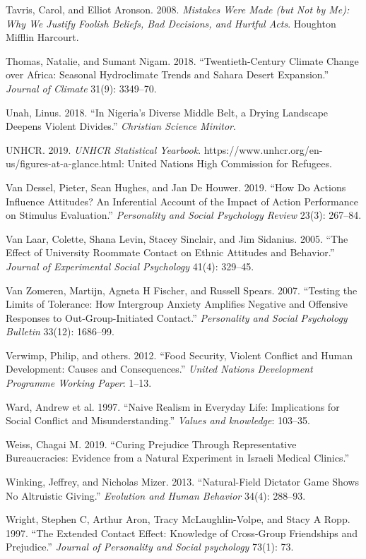 \documentclass[11pt]{article}
\begin{document}
\leavevmode\hypertarget{ref-tavris2008mistakes}{}%
Tavris, Carol, and Elliot Aronson. 2008. \emph{Mistakes Were Made (but
Not by Me): Why We Justify Foolish Beliefs, Bad Decisions, and Hurtful
Acts}. Houghton Mifflin Harcourt.

\leavevmode\hypertarget{ref-thomas2018sahara}{}%
Thomas, Natalie, and Sumant Nigam. 2018. ``Twentieth-Century Climate
Change over Africa: Seasonal Hydroclimate Trends and Sahara Desert
Expansion.'' \emph{Journal of Climate} 31(9): 3349--70.

\leavevmode\hypertarget{ref-unah2018nigeria}{}%
Unah, Linus. 2018. ``In Nigeria's Diverse Middle Belt, a Drying
Landscape Deepens Violent Divides.'' \emph{Christian Science Minitor}.

\leavevmode\hypertarget{ref-unhcr2019}{}%
UNHCR. 2019. \emph{UNHCR Statistical Yearbook}.
https://www.unhcr.org/en-us/figures-at-a-glance.html: United Nations
High Commission for Refugees.

\leavevmode\hypertarget{ref-van2019actions}{}%
Van Dessel, Pieter, Sean Hughes, and Jan De Houwer. 2019. ``How Do
Actions Influence Attitudes? An Inferential Account of the Impact of
Action Performance on Stimulus Evaluation.'' \emph{Personality and
Social Psychology Review} 23(3): 267--84.

\leavevmode\hypertarget{ref-van2005effect}{}%
Van Laar, Colette, Shana Levin, Stacey Sinclair, and Jim Sidanius. 2005.
``The Effect of University Roommate Contact on Ethnic Attitudes and
Behavior.'' \emph{Journal of Experimental Social Psychology} 41(4):
329--45.

\leavevmode\hypertarget{ref-van2007testing}{}%
Van Zomeren, Martijn, Agneta H Fischer, and Russell Spears. 2007.
``Testing the Limits of Tolerance: How Intergroup Anxiety Amplifies
Negative and Offensive Responses to Out-Group-Initiated Contact.''
\emph{Personality and Social Psychology Bulletin} 33(12): 1686--99.

\leavevmode\hypertarget{ref-verwimp2012food}{}%
Verwimp, Philip, and others. 2012. ``Food Security, Violent Conflict and
Human Development: Causes and Consequences.'' \emph{United Nations
Development Programme Working Paper}: 1--13.

\leavevmode\hypertarget{ref-ward1997naive}{}%
Ward, Andrew et al. 1997. ``Naive Realism in Everyday Life: Implications
for Social Conflict and Misunderstanding.'' \emph{Values and knowledge}:
103--35.

\leavevmode\hypertarget{ref-weiss2019curing}{}%
Weiss, Chagai M. 2019. ``Curing Prejudice Through Representative
Bureaucracies: Evidence from a Natural Experiment in Israeli Medical
Clinics.''

\leavevmode\hypertarget{ref-winking2013natural}{}%
Winking, Jeffrey, and Nicholas Mizer. 2013. ``Natural-Field Dictator
Game Shows No Altruistic Giving.'' \emph{Evolution and Human Behavior}
34(4): 288--93.

\leavevmode\hypertarget{ref-wright1997extended}{}%
Wright, Stephen C, Arthur Aron, Tracy McLaughlin-Volpe, and Stacy A
Ropp. 1997. ``The Extended Contact Effect: Knowledge of Cross-Group
Friendships and Prejudice.'' \emph{Journal of Personality and Social
psychology} 73(1): 73.
\end{document}
